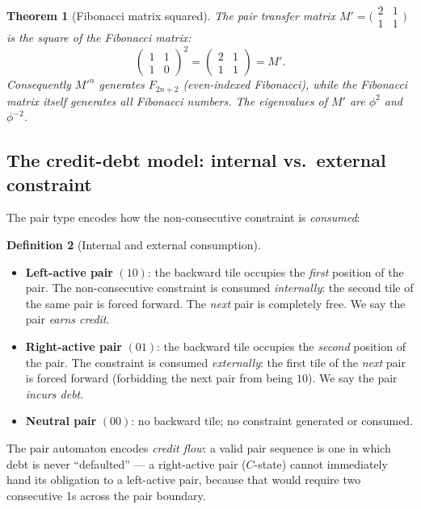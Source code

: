 \documentclass[12pt,reqno]{amsart}
\newtheorem{theorem}{Theorem}[section]
\theoremstyle{definition}
\newtheorem{definition}[theorem]{Definition}
\theoremstyle{plain}
\begin{document}
\begin{theorem}[Fibonacci matrix squared]\label{thm:fib-matrix}
The pair transfer matrix $M'=\bigl(\begin{smallmatrix}2&1\\1&1\end{smallmatrix}\bigr)$
is the square of the Fibonacci matrix:
\[
  \begin{pmatrix}1&1\\1&0\end{pmatrix}^2=\begin{pmatrix}2&1\\1&1\end{pmatrix}=M'.
\]
Consequently $M'^n$ generates $F_{2n+2}$ (even-indexed Fibonacci), while
the Fibonacci matrix itself generates all Fibonacci numbers.
The eigenvalues of $M'$ are $\phi^2$ and $\phi^{-2}$.
\end{theorem}

\subsection{The credit-debt model: internal vs.\ external constraint}
\label{ssec:credit-debt}

The pair type encodes how the non-consecutive constraint is \emph{consumed}:

\begin{definition}[Internal and external consumption]
\begin{itemize}
\item \textbf{Left-active pair} $(10)$: the backward tile occupies the
  \emph{first} position of the pair.  The non-consecutive constraint is
  consumed \emph{internally}: the second tile of the same pair is forced
  forward.  The \emph{next} pair is completely free.  We say the pair
  \emph{earns credit}.
\item \textbf{Right-active pair} $(01)$: the backward tile occupies the
  \emph{second} position of the pair.  The constraint is consumed
  \emph{externally}: the first tile of the \emph{next} pair is forced forward
  (forbidding the next pair from being $10$).  We say the pair
  \emph{incurs debt}.
\item \textbf{Neutral pair} $(00)$: no backward tile; no constraint
  generated or consumed.
\end{itemize}
\end{definition}

The pair automaton encodes \emph{credit flow}: a valid pair sequence is
one in which debt is never ``defaulted'' — a right-active pair ($C$-state)
cannot immediately hand its obligation to a left-active pair, because
that would require two consecutive 1s across the pair boundary.
\end{document}
